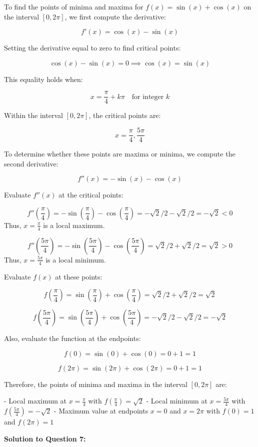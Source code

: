 \documentclass{article}
\begin{document}
To find the points of minima and maxima for \( f(x) = \sin(x) + \cos(x) \) on the interval \([0, 2\pi]\), we first compute the derivative:

\[
f'(x) = \cos(x) - \sin(x)
\]

Setting the derivative equal to zero to find critical points:

\[
\cos(x) - \sin(x) = 0 \implies \cos(x) = \sin(x)
\]

This equality holds when:

\[
x = \frac{\pi}{4} + k\pi \quad \text{for integer } k
\]

Within the interval \([0, 2\pi]\), the critical points are:

\[
x = \frac{\pi}{4}, \frac{5\pi}{4}
\]

To determine whether these points are maxima or minima, we compute the second derivative:

\[
f''(x) = -\sin(x) - \cos(x)
\]

Evaluate \( f''(x) \) at the critical points:

\[
f''\left(\frac{\pi}{4}\right) = -\sin\left(\frac{\pi}{4}\right) - \cos\left(\frac{\pi}{4}\right) = -\sqrt{2}/2 - \sqrt{2}/2 = -\sqrt{2} < 0
\]
Thus, \( x = \frac{\pi}{4} \) is a local maximum.

\[
f''\left(\frac{5\pi}{4}\right) = -\sin\left(\frac{5\pi}{4}\right) - \cos\left(\frac{5\pi}{4}\right) = \sqrt{2}/2 + \sqrt{2}/2 = \sqrt{2} > 0
\]
Thus, \( x = \frac{5\pi}{4} \) is a local minimum.

Evaluate \( f(x) \) at these points:

\[
f\left(\frac{\pi}{4}\right) = \sin\left(\frac{\pi}{4}\right) + \cos\left(\frac{\pi}{4}\right) = \sqrt{2}/2 + \sqrt{2}/2 = \sqrt{2}
\]

\[
f\left(\frac{5\pi}{4}\right) = \sin\left(\frac{5\pi}{4}\right) + \cos\left(\frac{5\pi}{4}\right) = -\sqrt{2}/2 - \sqrt{2}/2 = -\sqrt{2}
\]

Also, evaluate the function at the endpoints:

\[
f(0) = \sin(0) + \cos(0) = 0 + 1 = 1
\]

\[
f(2\pi) = \sin(2\pi) + \cos(2\pi) = 0 + 1 = 1
\]

Therefore, the points of minima and maxima in the interval \([0, 2\pi]\) are:

- Local maximum at \( x = \frac{\pi}{4} \) with \( f\left(\frac{\pi}{4}\right) = \sqrt{2} \)
- Local minimum at \( x = \frac{5\pi}{4} \) with \( f\left(\frac{5\pi}{4}\right) = -\sqrt{2} \)
- Maximum value at endpoints \( x = 0 \) and \( x = 2\pi \) with \( f(0) = 1 \) and \( f(2\pi) = 1 \)
    \item \textbf{Solution to Question 7:}
\end{document}
